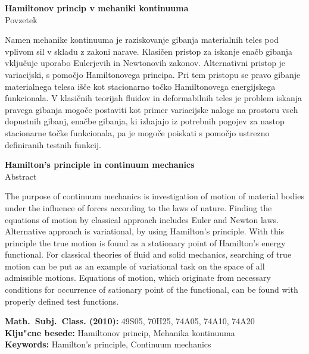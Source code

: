\begin{center}
{\bf Hamiltonov princip v mehaniki kontinuuma}\\[3mm]
{\sc Povzetek}
\end{center}

Namen mehanike kontinuuma je raziskovanje gibanja materialnih teles pod
vplivom sil v skladu z zakoni narave. Klasičen pristop za iskanje enačb gibanja
vključuje uporabo Eulerjevih in Newtonovih zakonov. Alternativni pristop
je variacijski, s pomočjo Hamiltonovega principa. Pri tem pristopu se pravo
gibanje materialnega telesa išče kot stacionarno točko Hamiltonovega
energijskega funkcionala. V klasičnih teorijah fluidov in deformabilnih teles je problem
iskanja pravega gibanja
mogoče postaviti kot primer variacijske naloge na prostoru vseh dopustnih gibanj,
enačbe gibanja, ki izhajajo iz potrebnih pogojev za nastop stacionarne točke
funkcionala, pa je mogoče poiskati s pomočjo ustrezno definiranih testnih funkcij.

\vfill
\begin{center}
{\bf Hamilton's principle in continuum mechanics}\\[3mm]
{\sc Abstract}
\end{center}

The purpose of continuum mechanics is investigation of motion of material bodies
under the influence of forces according to the laws of nature. Finding the equations of motion
by classical approach includes Euler and Newton laws. Alternative approach is
variational, by using Hamilton's principle. With this principle the true motion
is found as a stationary point of Hamilton's energy functional. For classical
theories of fluid and solid mechanics, searching of true motion can be put
as an example of variational task on the space of all admissible motions.
Equations of motion, which originate from necessary conditions for occurrence
of sationary point of the functional, can be found with properly defined test functions.


\vfill\noindent
{\bf Math.~Subj.~Class. (2010):} 49S05, 70H25, 74A05, 74A10, 74A20  \\[1mm]  
{\bf Klju"cne besede:} Hamiltonov princip, Mehanika kontinuuma \\[1mm]  
{\bf Keywords:} Hamilton's principle, Continuum mechanics